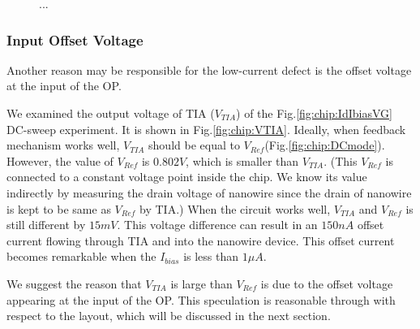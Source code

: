 \begin{figure}[tbh!p]
\centering
    \caption{...}
    \label{fig:chip:line}
\end{figure}


\subsubsection*{Input Offset Voltage}
Another reason may be responsible for the low-current defect is the offset voltage at the input of the OP.

We examined the output voltage of TIA ($V_{TIA}$) of the Fig.\ref{fig:chip:IdIbiasVG} DC-sweep experiment.
It is shown in Fig.\ref{fig:chip:VTIA}.
Ideally, when feedback mechanism works well, $V_{TIA}$ should be equal to $V_{Ref}$(Fig.\ref{fig:chip:DCmode}).
However, the value of $V_{Ref}$ is $0.802 V$, which is smaller than $V_{TIA}$.
(This $V_{Ref}$ is connected to a constant voltage point inside the chip.
We know its value indirectly by measuring the drain voltage of nanowire since the drain of nanowire is kept to be same as $V_{Ref}$ by TIA.)
When the circuit works well, $V_{TIA}$ and $V_{Ref}$ is still different by $15m V$.
This voltage difference can result in an $150n A$ offset current flowing through TIA and into the nanowire device.
This offset current becomes remarkable when the $I_{bias}$ is less than $1\mu A$.

We suggest the reason that $V_{TIA}$ is large than $V_{Ref}$ is due to the offset voltage appearing at the input of the OP.
This speculation is reasonable through with respect to the layout, which will be discussed in the next section.

